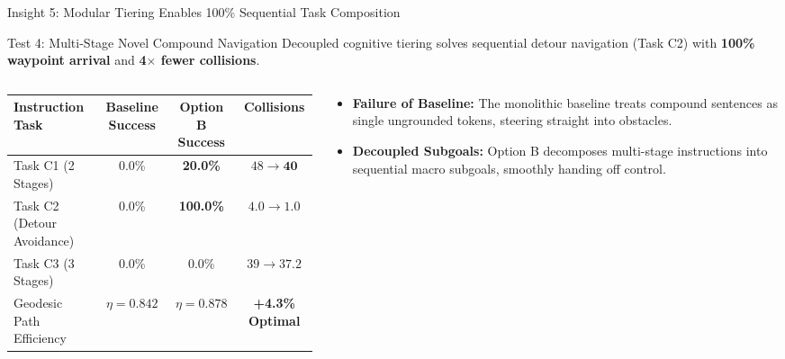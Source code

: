 \documentclass[aspectratio=169, 10pt]{beamer}
\begin{document}
\begin{frame}{Insight 5: Modular Tiering Enables 100\% Sequential Task Composition}
  \begin{block}{Test 4: Multi-Stage Novel Compound Navigation}
    Decoupled cognitive tiering solves sequential detour navigation (Task C2) with \textbf{100\% waypoint arrival} and \textbf{4$\times$ fewer collisions}.
  \end{block}
  \vspace{-0.2cm}
  \begin{columns}[T]
    \begin{column}{0.54\textwidth}
      \setlength{\tabcolsep}{2pt}
      \begin{table}
        \centering
        \scriptsize
        \begin{tabular}{lccc}
          \toprule
          \textbf{Instruction Task} & \textbf{Baseline Success} & \textbf{Option B Success} & \textbf{Collisions} \\
          \midrule
          Task C1 (2 Stages) & 0.0\% & \textbf{20.0\%} & $48 \to \mathbf{40}$ \\
          Task C2 (Detour Avoidance) & 0.0\% & \textbf{100.0\%} & $4.0 \to \mathbf{1.0}$ \\
          Task C3 (3 Stages) & 0.0\% & 0.0\% & $39 \to \mathbf{37.2}$ \\
          Geodesic Path Efficiency & $\eta = 0.842$ & \textbf{$\eta = 0.878$} & \textbf{+4.3\% Optimal} \\
          \bottomrule
        \end{tabular}
      \end{table}
    \end{column}
    \begin{column}{0.44\textwidth}
      \begin{itemize}
        \item \textbf{Failure of Baseline:} The monolithic baseline treats compound sentences as single ungrounded tokens, steering straight into obstacles.
        \item \textbf{Decoupled Subgoals:} Option B decomposes multi-stage instructions into sequential macro subgoals, smoothly handing off control.
      \end{itemize}
    \end{column}
  \end{columns}
\end{frame}
\end{document}

